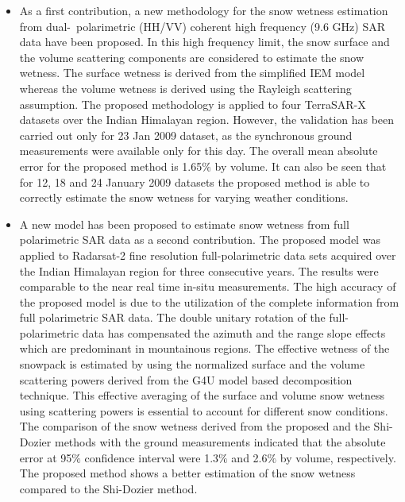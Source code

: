 \begin{itemize}
	\item As a first contribution, a new methodology for the snow wetness estimation from dual-~polarimetric (HH/VV) coherent high frequency (9.6 GHz) SAR data have been proposed. In this high frequency limit, the snow surface and the volume scattering components are considered to estimate the snow wetness. The surface wetness is derived from the simplified IEM model whereas the volume wetness is derived using the Rayleigh scattering assumption. The proposed methodology is applied to four TerraSAR-X datasets over the Indian Himalayan region. However, the validation has been carried out only for 23 Jan 2009 dataset, as the synchronous ground measurements were available only for this day. The overall mean absolute error for the proposed method is 1.65$\%$ by volume. It can also be seen that for 12, 18 and 24 January 2009 datasets the proposed method is able to correctly estimate the snow wetness for varying weather conditions. 
	
	\item A new model has been proposed to estimate snow wetness from full polarimetric SAR data as a second contribution. The proposed model was applied to Radarsat-2 fine resolution full-polarimetric data sets acquired over the Indian Himalayan region for three consecutive years. The results were comparable to the near real time in-situ measurements. The high accuracy of the proposed model is due to the utilization of the complete information from full polarimetric SAR data. The double unitary rotation of the full-polarimetric data has compensated the azimuth and the range slope effects which are predominant in mountainous regions. The effective wetness of the snowpack is estimated by using the normalized surface and the volume scattering powers derived from the G4U model based decomposition technique. This effective averaging of the surface and volume snow wetness using scattering powers is essential to account for different snow conditions. The comparison of the snow wetness derived from the proposed and the Shi-Dozier methods with the ground measurements indicated that the absolute error at 95$\%$ confidence interval were 1.3$\%$ and 2.6$\%$ by volume, respectively. The proposed method shows a better estimation of the snow wetness compared to the Shi-Dozier method.  
	

\end{itemize}
